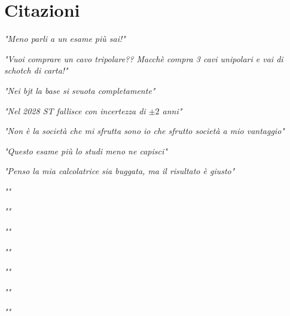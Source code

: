\chapter{Citazioni}

\raggedright
{\itshape "Meno parli a un esame più sai!"}
\raggedleft

\vspace{5mm}

\raggedleft
{\itshape "Vuoi comprare un cavo tripolare?? Macchè compra 3 cavi unipolari e vai di schotch di carta!"}
\raggedright

\vspace{5mm}

\raggedright
{\itshape "Nei bjt la base si svuota completamente"}
\raggedleft

\vspace{5mm}

\raggedleft
{\itshape "Nel 2028 ST fallisce con incertezza di $\pm 2$ anni"}
\raggedright

\vspace{5mm}

\raggedright
{\itshape "Non è la società che mi sfrutta sono io che sfrutto società a mio vantaggio"}
\raggedleft

\vspace{5mm}

\raggedleft
{\itshape "Questo esame più lo studi meno ne capisci"}
\raggedright

\vspace{5mm}

\raggedright
{\itshape "Penso la mia calcolatrice sia buggata, ma il risultato è giusto"}
\raggedleft

\vspace{5mm}

\raggedleft
{\itshape ""}
\raggedright

\vspace{5mm}

\raggedright
{\itshape ""}
\raggedleft

\vspace{5mm}

\raggedleft
{\itshape ""}
\raggedright

\vspace{5mm}

\raggedright
{\itshape ""}
\raggedleft

\vspace{5mm}

\raggedleft
{\itshape ""}
\raggedright

\vspace{5mm}

\raggedright
{\itshape ""}
\raggedleft

\vspace{5mm}

\raggedleft
{\itshape ""}
\raggedright
